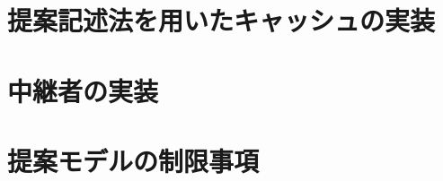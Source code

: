 \documentclass[12pt,a4paper]{jbook}
\begin{document}
\section{提案記述法を用いたキャッシュの実装}
\section{中継者の実装}
\section{提案モデルの制限事項}
\end{document}
